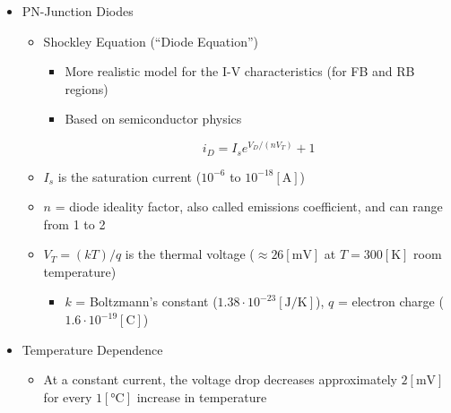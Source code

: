 \begin{itemize}

  \item PN-Junction Diodes

    \begin{itemize}

      \item Shockley Equation (``Diode Equation'')

        \begin{itemize}

          \item More realistic model for the I-V characteristics (for FB and RB regions)

          \item Based on semiconductor physics

            $$i_D=I_se^{V_D/(nV_T)}+1$$

        \end{itemize}

      \item $I_s$ is the saturation current ($10^{-6}$ to $10^{-18}[\si{\ampere}]$)

      \item $n$ = diode ideality factor, also called emissions coefficient, and can range from 1 to 2

      \item $V_T=(kT)/q$ is the thermal voltage ($\approx26[\si{\milli\volt}]$ at $T=300[\si{\kelvin}]$ room temperature)

        \begin{itemize}

          \item $k$ = Boltzmann's constant ($1.38\cdot10^{-23}[\si{\joule}/\si{\kelvin}]$), $q$ = electron charge ($1.6\cdot10^{-19}[\si{\coulomb}]$)

        \end{itemize}

    \end{itemize}

  \item Temperature Dependence

    \begin{itemize}

      \item At a constant current, the voltage drop decreases approximately $2[\si{\milli\volt}]$ for every $1[\si{\celsius}]$ increase in temperature

    \end{itemize}


\end{itemize}
